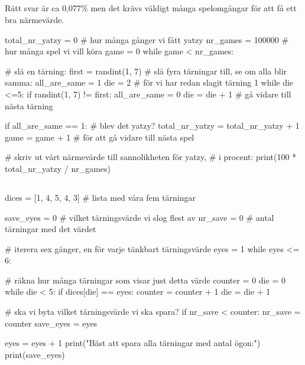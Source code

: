 \subsection*{}
Rätt svar är ca 0,077\% men det krävs väldigt många spelomgångar för att få ett bra närmevärde.
\vspace{10pt}
\begin{python}
total_nr_yatzy = 0 # hur många gånger vi fått yatzy
nr_games = 100000 # hur många spel vi vill köra
game = 0
while game < nr_games:

  # slå en tärning:
  first = randint(1, 7)
  # slå fyra tärningar till, se om alla blir samma:
  all_are_same = 1
  die = 2 # för vi har redan slagit tärning 1
  while die <=5:
    if randint(1, 7) != first:
      all_are_same = 0
    die = die + 1 # gå vidare till nästa tärning

  if all_are_same == 1: # blev det yatzy?
    total_nr_yatzy = total_nr_yatzy + 1
  game = game + 1 # för att gå vidare till nästa spel

# skriv ut vårt närmevärde till sannolikheten för yatzy,
# i procent:
print(100 * total_nr_yatzy / nr_games)
\end{python}

\subsection*{}



\vspace{3pt}
\begin{python}
dices = [1, 4, 5, 4, 3] # lista med våra fem tärningar

save_eyes = 0 # vilket tärningsvärde vi slog flest av
nr_save = 0 # antal tärningar med det värdet

# iterera sex gånger, en för varje tänkbart tärningsvärde
eyes = 1
while eyes <= 6:

  # räkna hur många tärningar som visar just detta värde
  counter = 0
  die = 0
  while die < 5:
    if dices[die] == eyes:
      counter = counter + 1
    die = die + 1

  # ska vi byta vilket tärningsvärde vi ska spara?
  if nr_save < counter:
    nr_save = counter
    save_eyes = eyes

  eyes = eyes + 1
print("Bäst att spara alla tärningar med antal ögon:")
print(save_eyes)
\end{python}

